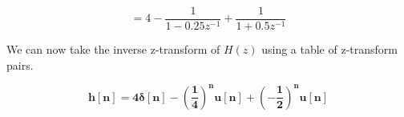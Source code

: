 \documentclass[fleqn]{article}
\begin{document}
\begin{enumerate}[nolistsep]
\begin{enumerate}[nolistsep]
					\begin{equation*}
						= 4 - \frac{1}{1-0.25z^{-1}} + \frac{1}{1+0.5z^{-1}}
					\end{equation*}
					
					We can now take the inverse z-transform of $H(z)$ using a table of z-transform pairs.
					
					\begin{equation*}
						\mathbf{h[n] = 4\delta[n] - \left(\frac{1}{4}\right)^nu[n] + \left(-\frac{1}{2}\right)^nu[n]}
					\end{equation*}
			\end{enumerate}
	\end{enumerate}
	
\end{document}
